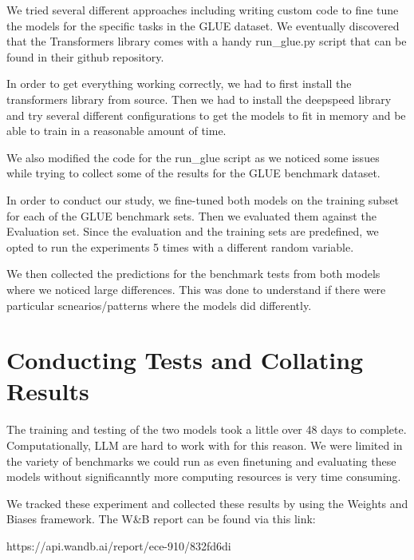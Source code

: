 \documentclass[\main/thesis.tex]{subfiles}
\begin{document}
We tried several different approaches including writing custom code to fine tune the models for 
the specific tasks in the GLUE dataset. We eventually discovered that the Transformers library 
comes with a handy run\_glue.py script that can be found in their github repository.

In order to get everything working correctly, we had to first install the transformers library 
from source. Then we had to install the deepspeed library and try several different configurations 
to get the models to fit in memory and be able to train in a reasonable amount of time. 


We also modified the code for the run\_glue script as we noticed some issues while trying to collect
some of the results for the GLUE benchmark dataset. 


In order to conduct our study, we fine-tuned both models on the training subset for each of the GLUE 
benchmark sets. Then we evaluated them against the Evaluation set. Since the evaluation and the 
training sets are predefined, we opted to run the experiments 5 times with a different random variable. 

We then collected the predictions for the benchmark tests from both models where we noticed 
large differences. This was done to understand if there were particular scnearios/patterns where the 
models did differently. 

\section{Conducting Tests and Collating Results}

The training and testing of the two models took a little over 48 days to complete. Computationally, 
LLM are hard to work with for this reason. We were limited in the variety of benchmarks we could run
as even finetuning and evaluating these models without significanntly more computing resources is very 
time consuming. 

We tracked these experiment and collected these results by using the Weights and Biases framework. The 
W\&B report can be found via this link: 

https://api.wandb.ai/report/ece-910/832fd6di
\end{document}
